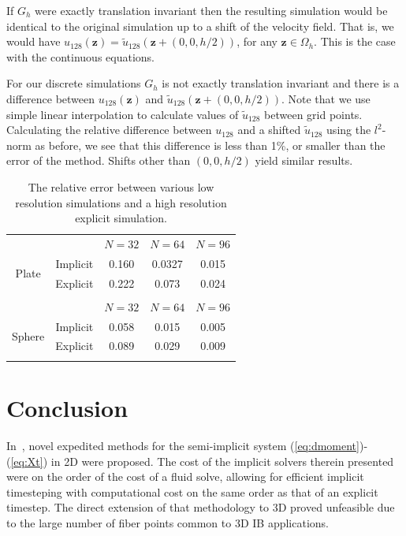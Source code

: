 \documentclass[preprint,12pt]{elsarticle}
\newcommand{\B}[1]{\mathbf{#1}}
\newcommand{\TableTopSpace}{\rule{0cm}{2.625ex}}
\begin{document}
If $G_h$ were exactly translation invariant then the resulting simulation would be identical to the original simulation up to a shift of the velocity field. That is, we would have $u_{128}(\B{z}) = \tilde{u}_{128}(\B{z} + (0,0,h/2))$, for any $\B{z}\in\Omega_h$. This is the case with the continuous equations.

For our discrete simulations $G_h$ is not exactly translation invariant and there is a difference between $u_{128}(\B{z})$ and $\tilde{u}_{128}(\B{z} + (0,0,h/2))$. Note that we use simple linear interpolation to calculate values of $\tilde{u}_{128}$ between grid points. 
Calculating the relative difference between $u_{128}$ and a shifted $\tilde{u}_{128}$  using the $l^2$-norm as before, we see that this difference is less than 1\%, or smaller than the error of the method. Shifts other than $(0,0,h/2)$ yield similar results.


\begin{table}
\caption{The relative error between various low resolution simulations and a high resolution explicit simulation.}
\label{table:TotalError}
\begin{center}

\begin{tabular}{c c c c c}
  &  & $N=32$ & $N=64$ & $N=96$ \\
\cline{3-5}
\multirow{2}{*}{Plate}
& \multicolumn{1}{c|}{Implicit} & \TableTopSpace
   0.160 & 0.0327 & 0.015 \\
& \multicolumn{1}{c|}{Explicit} & \TableTopSpace
   0.222 & 0.073 & 0.024 \\
\vspace{.15 cm}
\\
  &  & $N=32$ & $N=64$ & $N=96$ \\
\cline{3-5}
\multirow{2}{*}{Sphere}
& \multicolumn{1}{c|}{Implicit} & \TableTopSpace
	0.058 & 0.015 & 0.005 \\
& \multicolumn{1}{c|}{Explicit} & \TableTopSpace
  0.089 & 0.029 & 0.009 \\
\vspace{.15 cm}
\end{tabular}
   
\end{center}
\end{table}





\section{Conclusion}
\label{Sec:Conclusion}
In~\cite{IBM_Implicit2D}, novel expedited methods for  the semi-implicit system (\ref{eq:dmoment})-(\ref{eq:Xt}) in 2D were proposed. 
The cost of the implicit solvers therein presented were on the order of the cost of a fluid solve, allowing for efficient implicit timesteping with computational cost on the same order as that of an explicit timestep. The direct extension of that methodology to 3D proved unfeasible due to the large number of fiber points common to 3D IB applications.
\end{document}
